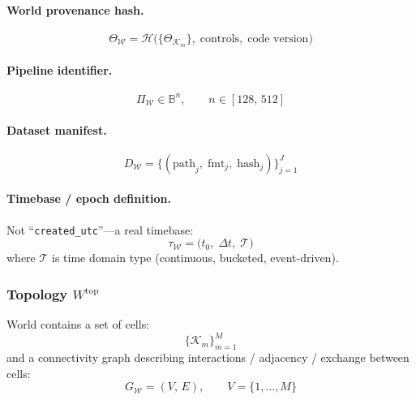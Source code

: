 \documentclass[11pt, a4paper, oneside]{article}
\theoremstyle{definition}
\theoremstyle{remark}
\newcommand{\Bset}{\mathbb{B}}
\begin{document}
\paragraph{World provenance hash.}
\begin{equation}
  \Theta_{\mathcal{W}} =
  \mathcal{H}\!\bigl(
    \{\Theta_{\mathcal{K}_m}\},\;
    \text{controls},\;
    \text{code version}
  \bigr)
  \label{eq:world-hash}
\end{equation}

\paragraph{Pipeline identifier.}
\[
  \Pi_{\mathcal{W}} \in \Bset^{n}, \qquad n \in [128,\,512]
\]

\paragraph{Dataset manifest.}
\begin{equation}
  D_{\mathcal{W}} =
  \bigl\{
    (\text{path}_j,\;\text{fmt}_j,\;\text{hash}_j)
  \bigr\}_{j=1}^{J}
  \label{eq:dataset-manifest}
\end{equation}

\paragraph{Timebase / epoch definition.}

Not ``\texttt{created\_utc}''—a real timebase:
\begin{equation}
  \tau_{\mathcal{W}} =
  \bigl(t_0,\;\Delta t,\;\mathcal{T}\bigr)
  \label{eq:timebase}
\end{equation}
where $\mathcal{T}$ is time domain type (continuous, bucketed,
event-driven).

\subsubsection{Topology \texorpdfstring{$W^{\mathrm{top}}$}{Wtop}}
\label{sec:world-topology}

World contains a set of cells:
\[
  \{\mathcal{K}_m\}_{m=1}^{M}
\]
and a connectivity graph describing interactions / adjacency /
exchange between cells:
\begin{equation}
  G_{\mathcal{W}} = (V,\,E),
  \qquad V = \{1,\ldots,M\}
  \label{eq:world-graph}
\end{equation}
\end{document}

